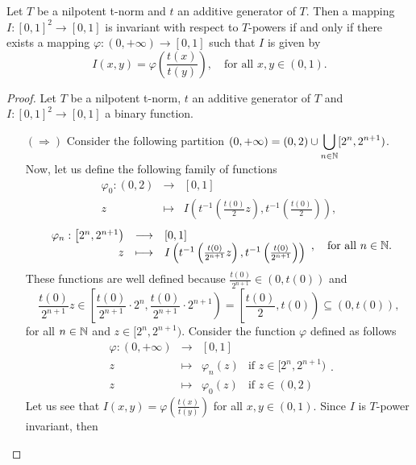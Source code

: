 \begin{theorem}\label{thm:nilpot:invimp}
	Let $T$ be a nilpotent t-norm and $t$ an additive generator of $T$. Then a mapping $I:[0,1]^2 \to [0,1]$ is invariant with respect to $T$-powers if and only if there exists a mapping $\varphi:(0,+\infty) \to [0,1]$ such that $I$ is given by
	\begin{equation}\label{eq:nilpot:invimpl}
		I(x,y)=\varphi \left(\frac{t(x)}{t(y)}\right), \quad \text{for all } x,y \in (0,1).
	\end{equation}
\end{theorem}
\begin{proof} Let $T$ be a nilpotent t-norm, $t$ an additive generator of $T$ and $I:[0,1]^2 \to [0,1]$ a binary function.
	\begin{itemize}
		\item[$(\Rightarrow)$] Consider the following partition $\displaystyle (0,+\infty)=(0,2) \cup  \bigcup_{n \in \mathbb{N}}[2^n,2^{n+1})$. Now, let us define the following family of functions
		$$
		\begin{array}{rcl}
			\varphi_0:\left(0,2\right)&\longrightarrow&[0,1]\\
			z&\longmapsto& I\left(t^{-1}\left(\frac{t(0)}{2}z\right),t^{-1}\left(\frac{t(0)}{2}\right)\right),
		\end{array}
		$$
		$$
		\begin{array}{rcl}
			\varphi_n:\left[2^n,2^{n+1}\right)&\longrightarrow&[0,1]\\
			z&\longmapsto& I\left(t^{-1}\left(\frac{t(0)}{2^{n+1}}z\right),t^{-1}\left(\frac{t(0)}{2^{n+1}}\right)\right)
		\end{array},
		\quad
		\text{for all } n \in \mathbb{N}.
		$$
		These functions are well defined because $\frac{t(0)}{2^{n+1}} \in (0,t(0))$ and
		$$\frac{t(0)}{2^{n+1}}z \in \left[\frac{t(0)}{2^{n+1}} \cdot 2^n ,\frac{t(0)}{2^{n+1}} \cdot 2^{n+1}\right) = \left[\frac{t(0)}{2},t(0)\right) \subseteq (0,t(0)),$$
		for all $n \in \mathbb{N}$ and $z \in [2^n,2^{n+1})$. Consider the function $\varphi$ defined as follows
		$$
		\begin{array}{rcll	}
			\varphi:(0,+\infty)&\longrightarrow&[0,1]\\
			z&\longmapsto& \varphi_n(z) &\text{if } z \in [2^n,2^{n+1})\\
			z&\longmapsto& \varphi_0(z) &\text{if } z \in (0,2)
		\end{array}.
		$$
		Let us see that $I(x,y)= \varphi \left(\frac{t(x)}{t(y)}\right)$ for all $x,y \in (0,1)$. Since $I$ is $T$-power invariant, then

\end{itemize}
\end{proof}
